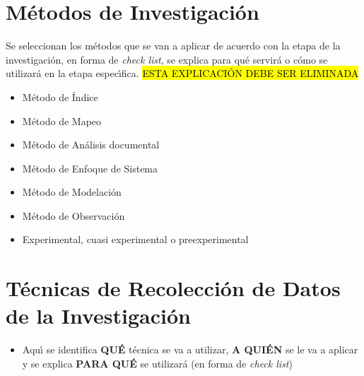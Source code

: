 \section{M\'{e}todos de Investigaci\'{o}n}
\label{cap2:sec:metodos_de_investigacion}

Se seleccionan los m\'{e}todos que se van a aplicar de acuerdo con la etapa de la investigaci\'{o}n, 
en forma de \textit{check list}, se explica para qu\'{e} servir\'{a} o c\'{o}mo se utilizar\'{a} en la etapa 
espec\'{\i}fica. \hl{ESTA EXPLICACI\'{O}N DEBE SER ELIMINADA} 

\begin{itemize}
    \item M\'{e}todo de \'{I}ndice  

    \item M\'{e}todo de Mapeo 

    \item M\'{e}todo de An\'{a}lisis documental

    \item M\'{e}todo de Enfoque de Sistema 

    \item M\'{e}todo de Modelaci\'{o}n 

    \item M\'{e}todo de Observaci\'{o}n 

    \item Experimental, cuasi experimental o preexperimental 
\end{itemize}

\section{T\'ecnicas de Recolecci\'on de Datos de la Investigaci\'on }
\label{cap2:sec:tecnicas_de_recoleccion_de_datos_de_la_investigacion }

\begin{itemize}
    \item Aqu\'{\i} se identifica \textbf{QU\'{E}} t\'{e}cnica se va a utilizar, \textbf{A QUI\'{E}N} se le 
          va a aplicar y se explica \textbf{PARA QU\'{E}} se utilizar\'{a} (en forma de \textit{check list})  
\end{itemize}


